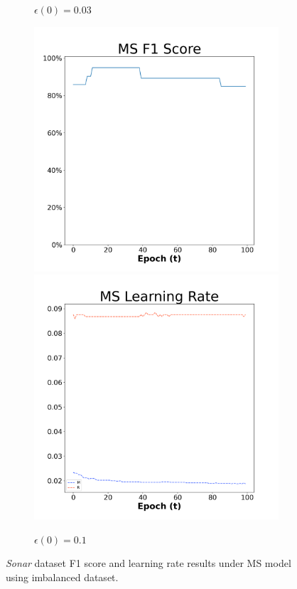 \begin{figure}[H]
\begin{subfigure}{0.3\textwidth}
  \caption{$\epsilon(0)=0.03$}
\end{subfigure}\hfil %
\begin{subfigure}{0.3\textwidth}
  \includegraphics[width=\linewidth]{images/exper2/Sonar/MS_0.1_f1.png}
  \includegraphics[width=\linewidth]{images/exper2/Sonar/MS_0.1_lr.png}
  \caption{$\epsilon(0)=0.1$}
\end{subfigure}

\caption{\textit{Sonar} dataset F1 score and learning rate results under MS model using imbalanced dataset.}
\end{figure}


